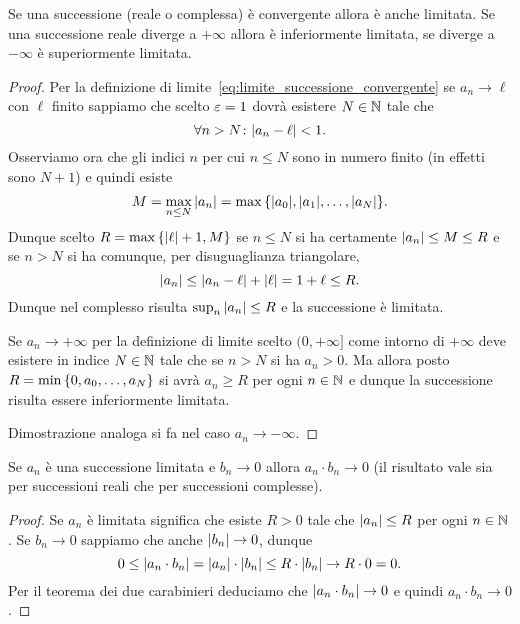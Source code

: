 \begin{theorem}
\mymark{**}%
Se una successione (reale o complessa) è convergente allora è anche limitata.
Se una successione reale diverge a $+\infty$ allora è inferiormente limitata,
se diverge a $-\infty$ è superiormente limitata.
\end{theorem}
%
\begin{proof}
  Per la definizione di limite~\eqref{eq:limite_successione_convergente} 
  se $a_n\to \ell$ con $\ell$ finito sappiamo 
  che scelto $\varepsilon=1$ dovrà esistere $N\in \mathbb N$ tale che 
  \[
      \forall n>N\colon {\left|a_n - \ell\right|} < 1.
  \]
  Osserviamo ora che gli indici $n$ per cui $n\le N$ sono in numero finito 
  (in effetti sono $N+1$) e quindi esiste
  \[
   M = \max_{n\le N} {\left|a_n\right|} 
   = \max {\left\{ {\left|a_0\right|}, {\left|a_1\right|}, \dots , {\left|a_N\right|} \right\}}.  
  \]
  Dunque scelto $R=\max{\left\{ {\left|\ell\right|}+1,M \right\}}$ 
  se $n\le N$ si ha certamente ${\left|a_n\right|}\le M \le R$
  e se $n>N$ si ha comunque, per disuguaglianza triangolare,
  \[
  {\left|a_n\right|} \le {\left|a_n-\ell\right|} + {\left|\ell\right|} = 1+ \ell \le R.  
  \]
  Dunque nel complesso risulta $\sup_n {\left|a_n\right|}\le R$ e la successione 
  è limitata.

  Se $a_n\to +\infty$ per la definizione di limite 
  scelto $(0,+\infty]$ come intorno di $+\infty$ 
  deve esistere in indice $N\in \mathbb N$ tale che se $n>N$ si ha $a_n>0$. 
  Ma allora posto $R=\min{\left\{ 0, a_0,\dots,a_N \right\}}$
  si avrà $a_n\ge R$ per ogni $n\in \mathbb N$ e dunque la successione 
  risulta essere inferiormente limitata.

  Dimostrazione analoga si fa nel caso $a_n\to -\infty$.
\end{proof}


\begin{theorem}
\mymark{**}%
%
Se $a_n$ è una successione limitata e $b_n\to 0$ allora
$a_n\cdot b_n \to 0$ (il risultato vale sia per successioni reali 
che per successioni complesse).
\end{theorem}
%
\begin{proof}
  Se $a_n$ è limitata significa che esiste $R>0$ tale che ${\left|a_n\right|}\le R$ per
  ogni $n\in \mathbb N$.
  Se $b_n\to 0$ sappiamo che anche ${\left|b_n\right|}\to 0$, dunque
  \[  
    0
    \le {\left|a_n\cdot b_n\right|} 
    = {\left|a_n\right|}\cdot {\left|b_n\right|} 
    \le R\cdot {\left|b_n\right|}\to R\cdot 0 = 0.
  \]
  Per il teorema dei due carabinieri deduciamo che ${\left|a_n\cdot b_n\right|}\to 0$ 
  e quindi $a_n\cdot b_n \to 0$.
\end{proof}

